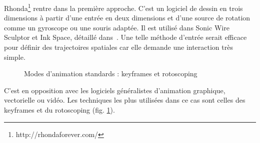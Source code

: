\documentclass[french,12pt]{article}
\begin{document}
Rhonda\footnote{http://rhondaforever.com/} rentre dans la première approche. C'est un logiciel de dessin en trois dimensions à partir d'une entrée en deux dimensions et d'une source de rotation comme un gyroscope ou une souris adaptée. Il est utilisé dans Sonic Wire Sculptor et Ink Space, détaillé dans~\cite{rasmuson_flying_2013}. Une telle méthode d'entrée serait efficace pour définir des trajectoires spatiales car elle demande une interaction très simple.

\begin{figure}[h]
\begin{center}

\caption{Modes d'animation standards : keyframes et rotoscoping}
\label{fig.animation}
\end{center}
\end{figure}
C'est en opposition avec les logiciels généralistes d'animation graphique, vectorielle ou vidéo. Les techniques les plus utilisées dans ce cas sont celles des keyframes et du rotoscoping (fig. \ref{fig.animation}).
\end{document}
